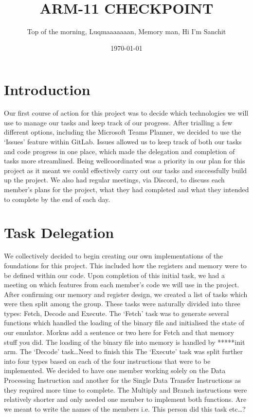 \documentclass[11pt]{article}
\begin{document}
\title{ARM-11 CHECKPOINT}

\author{Top of the morning, Luqmaaaaaaan, Memory man, Hi I'm Sanchit}

\date{\today}

\maketitle

\section*{Introduction}
Our first course of action for this project was to decide which technologies we will use to manage our tasks
and keep track of our progress. After trialling a few different options, including the Microsoft Teams Planner,
we decided to use the ‘Issues’ feature within GitLab. Issues allowed us to keep track of both our tasks and code
progress in one place, which made the delegation and completion of tasks more streamlined. Being wellcoordinated was a priority in our plan for this project as it meant we could effectively carry out our tasks and
successfully build up the project. We also had regular meetings, via Discord, to discuss each member’s plans
for the project, what they had completed and what they intended to complete by the end of each day. 


\section*{Task Delegation}
We collectively decided to begin creating our own implementations of the foundations for this project. This
included how the registers and memory were to be defined within our code. Upon completion of this initial
task, we had a meeting on which features from each member’s code we will use in the project. After
confirming our memory and register design, we created a list of tasks which were then split among the group.
These tasks were naturally divided into three types: Fetch, Decode and Execute.
The ‘Fetch’ task was to generate several functions which handled the loading of the binary file and initialised
the state of our emulator. Morkus add a sentence or two here for Fetch and that memory stuff you did. The
loading of the binary file into memory is handled by *****init arm.
The ‘Decode’ task…Need to finish this
The ‘Execute’ task was split further into four types based on each of the four instructions that were to be
implemented. We decided to have one member working solely on the Data Processing Instruction and another
for the Single Data Transfer Instructions as they required more time to complete. The Multiply and Branch
instructions were relatively shorter and only needed one member to implement both functions.
Are we meant to write the names of the members i.e. This person did this task etc…?
\end{document}
